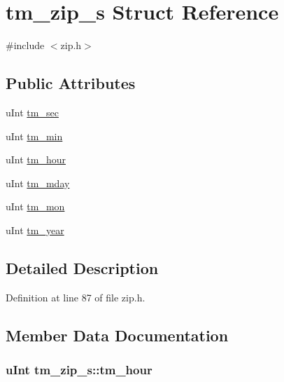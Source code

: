 \hypertarget{structtm__zip__s}{\section{tm\+\_\+zip\+\_\+s Struct Reference}
\label{structtm__zip__s}
}


{\ttfamily \#include $<$zip.\+h$>$}

\subsection*{Public Attributes}
\begin{DoxyCompactItemize}
\item 
u\+Int \hyperlink{structtm__zip__s_adf073cb37484b209d7f7f0e23275a52d}{tm\+\_\+sec}
\item 
u\+Int \hyperlink{structtm__zip__s_ad539676c1522e9f2cb77cb9e65795e2a}{tm\+\_\+min}
\item 
u\+Int \hyperlink{structtm__zip__s_abfde1cc7378be65b4b23e1488e9bd279}{tm\+\_\+hour}
\item 
u\+Int \hyperlink{structtm__zip__s_aebc461dd0a4a7b7ebd4e00de5fbf594d}{tm\+\_\+mday}
\item 
u\+Int \hyperlink{structtm__zip__s_ae98d11f7e2b2330b3a83efe97ffef574}{tm\+\_\+mon}
\item 
u\+Int \hyperlink{structtm__zip__s_ad58d60c6a536a0861dec11c6ef270753}{tm\+\_\+year}
\end{DoxyCompactItemize}


\subsection{Detailed Description}


Definition at line 87 of file zip.\+h.



\subsection{Member Data Documentation}
\hypertarget{structtm__zip__s_abfde1cc7378be65b4b23e1488e9bd279}{
\subsubsection[{tm\+\_\+hour}]{\setlength{\rightskip}{0pt plus 5cm}u\+Int tm\+\_\+zip\+\_\+s\+::tm\+\_\+hour}}\label{structtm__zip__s_abfde1cc7378be65b4b23e1488e9bd279}


